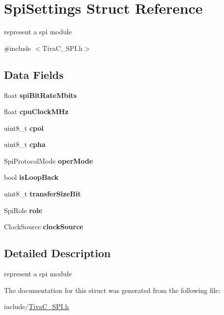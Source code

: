 \hypertarget{structSpiSettings}{}\section{Spi\+Settings Struct Reference}
\label{structSpiSettings}


represent a spi module  




{\ttfamily \#include $<$Tiva\+C\+\_\+\+S\+P\+I.\+h$>$}

\subsection*{Data Fields}
\begin{DoxyCompactItemize}
\item 
\mbox{\label{structSpiSettings_a99801e41fdf2b15ea72d8110113ed9a5}} 
float {\bfseries spi\+Bit\+Rate\+Mbits}
\item 
\mbox{\label{structSpiSettings_a7b1ce22350b816f1894b31c87ac910df}} 
float {\bfseries cpu\+Clock\+M\+Hz}
\item 
\mbox{\label{structSpiSettings_a65fe4141e430269f8a4225afeb1f15ff}} 
uint8\+\_\+t {\bfseries cpol}
\item 
\mbox{\label{structSpiSettings_a6238bbd50ff3172c17c4b0a56e8d2a0a}} 
uint8\+\_\+t {\bfseries cpha}
\item 
\mbox{\label{structSpiSettings_ad306502c3e0745a87f605092b62ab917}} 
Spi\+Protocol\+Mode {\bfseries oper\+Mode}
\item 
\mbox{\label{structSpiSettings_a2d0fbd9ec2a25981a8aa70f9bbbcc908}} 
bool {\bfseries is\+Loop\+Back}
\item 
\mbox{\label{structSpiSettings_a56004a7786b6ffb50526c28ba8f88a2e}} 
uint8\+\_\+t {\bfseries transfer\+Size\+Bit}
\item 
\mbox{\label{structSpiSettings_a2aea772f2d0fd82d0195fcb9a0d54171}} 
Spi\+Role {\bfseries role}
\item 
\mbox{\label{structSpiSettings_aa3c89980270221ebaf0a04358777c152}} 
Clock\+Source {\bfseries clock\+Source}
\end{DoxyCompactItemize}


\subsection{Detailed Description}
represent a spi module 

The documentation for this struct was generated from the following file\+:\begin{DoxyCompactItemize}
\item 
include/\hyperlink{TivaC__SPI_8h}{Tiva\+C\+\_\+\+S\+P\+I.\+h}\end{DoxyCompactItemize}
